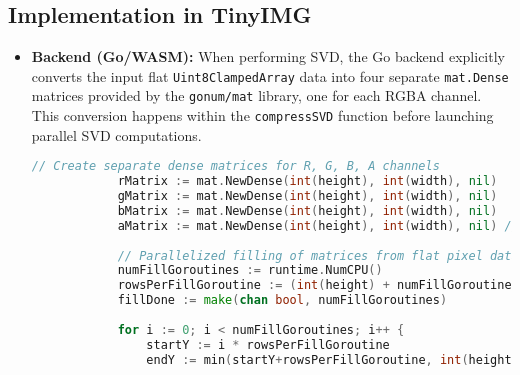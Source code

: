 \documentclass{article}
\begin{document}
\subsection{Implementation in TinyIMG}
\begin{itemize}
    \item \textbf{Backend (Go/WASM):} When performing SVD, the Go backend explicitly converts the input flat \texttt{Uint8ClampedArray} data into four separate \texttt{mat.Dense} matrices provided by the \texttt{gonum/mat} library, one for each RGBA channel. This conversion happens within the \texttt{compressSVD} function before launching parallel SVD computations.
        \begin{lstlisting}[language=Go, caption={Go code snippet: Creating channel matrices (Illustrative)}, label={lst:matrix_creation}]
            // Create separate dense matrices for R, G, B, A channels
            rMatrix := mat.NewDense(int(height), int(width), nil)
            gMatrix := mat.NewDense(int(height), int(width), nil)
            bMatrix := mat.NewDense(int(height), int(width), nil)
            aMatrix := mat.NewDense(int(height), int(width), nil) // Compressing Alpha too
            
            // Parallelized filling of matrices from flat pixel data
            numFillGoroutines := runtime.NumCPU()
            rowsPerFillGoroutine := (int(height) + numFillGoroutines - 1) / numFillGoroutines
            fillDone := make(chan bool, numFillGoroutines)
            
            for i := 0; i < numFillGoroutines; i++ {
                startY := i * rowsPerFillGoroutine
                endY := min(startY+rowsPerFillGoroutine, int(height))
            

\end{lstlisting}
\end{itemize}
\end{document}
